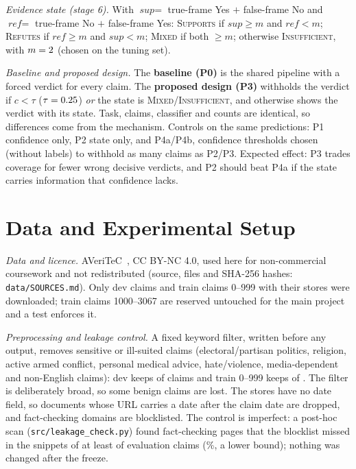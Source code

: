 \documentclass[acmlarge]{acmart}
\newcommand{\evs}[1]{\textsc{#1}}
\newcommand{\runin}[1]{\par\addvspace{4pt}\noindent\hspace{\parindent}\textit{#1}\hspace{0.45em}\ignorespaces}
\begin{document}
\runin{Evidence state (stage 6).} With $\textit{sup}=$ true-frame Yes $+$ false-frame No and $\textit{ref}=$ true-frame No $+$ false-frame Yes: \evs{Supports} if $\textit{sup}\ge m$ and $\textit{ref}<m$; \evs{Refutes} if $\textit{ref}\ge m$ and $\textit{sup}<m$; \evs{Mixed} if both $\ge m$; otherwise \evs{Insufficient}, with $m=2$ (chosen on the tuning set).

\runin{Baseline and proposed design.} The \textbf{baseline (P0)} is the shared pipeline with a forced verdict for every claim. The \textbf{proposed design (P3)} withholds the verdict if $c<\tau$ ($\tau=0.25$) \emph{or} the state is \evs{Mixed}/\evs{Insufficient}, and otherwise shows the verdict with its state. Task, claims, classifier and counts are identical, so differences come from the mechanism. Controls on the same predictions: P1 confidence only, P2 state only, and P4a/P4b, confidence thresholds chosen (without labels) to withhold as many claims as P2/P3. Expected effect: P3 trades coverage for fewer wrong decisive verdicts, and P2 should beat P4a if the state carries information that confidence lacks.

\section{Data and Experimental Setup}\label{sec:data}
\runin{Data and licence.} AVeriTeC~\cite{schlichtkrull2023,schlichtkrull2024}, CC BY-NC 4.0, used here for non-commercial coursework and not redistributed (source, files and SHA-256 hashes: \texttt{data/SOURCES.md}). Only dev claims and train claims 0--999 with their stores were downloaded; train claims 1000--3067 are reserved untouched for the main project and a test enforces it.

\runin{Preprocessing and leakage control.} A fixed keyword filter, written before any output, removes sensitive or ill-suited claims (electoral/partisan politics, religion, active armed conflict, personal medical advice, hate/violence, media-dependent and non-English claims): dev keeps \exclKeptDev{} of \exclTotalDev{} claims and train 0--999 keeps \exclKeptTrain{} of \exclTotalTrain{}. The filter is deliberately broad, so some benign claims are lost. The stores have no date field, so documents whose URL carries a date after the claim date are dropped, and fact-checking domains are blocklisted. The control is imperfect: a post-hoc scan (\texttt{src/leakage\_check.py}) found fact-checking pages that the blocklist missed in the snippets of at least \leakClaims{} of \nPool{} evaluation claims (\leakShare\%, a lower bound); nothing was changed after the freeze.
\end{document}
